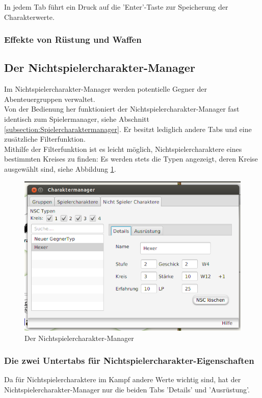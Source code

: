 \documentclass[11pt, a4paper, german]{article}
\begin{document}
In jedem Tab führt ein Druck auf die 'Enter'-Taste zur Speicherung der Charakterwerte.


\subsubsection{Effekte von Rüstung und Waffen} \label{Abschnitt: Effekte}


\subsection{Der Nichtspielercharakter-Manager}
Im Nichtspielercharakter-Manager werden potentielle Gegner der Abenteuergruppen verwaltet. \\

Von der Bedienung her funktioniert der Nichtspielercharakter-Manager fast identisch zum Spielermanager, siehe Abschnitt \ref{subsection:Spielercharaktermanager}. Er besitzt lediglich andere Tabs und eine zusätzliche Filterfunktion.\\

Mithilfe der Filterfunktion ist es leicht möglich, Nichtspielercharaktere eines bestimmten Kreises zu finden: Es werden stets die Typen angezeigt, deren Kreise ausgewählt sind, siehe Abbildung \ref{fig:Nichtspielertypmanager1}.
\begin{figure}
\centering
\includegraphics[width=1\linewidth]{Bilder/Nichtspielertypmanager1}
\caption{Der Nichtspielercharakter-Manager}
\label{fig:Nichtspielertypmanager1}
\end{figure}


\subsubsection{Die zwei Untertabs für Nichtspielercharakter-Eigenschaften}
Da für Nichtspielercharaktere im Kampf andere Werte wichtig sind, hat der Nichtspielercharakter-Manager nur die beiden Tabs 'Details' und 'Ausrüstung'.\\
\end{document}
